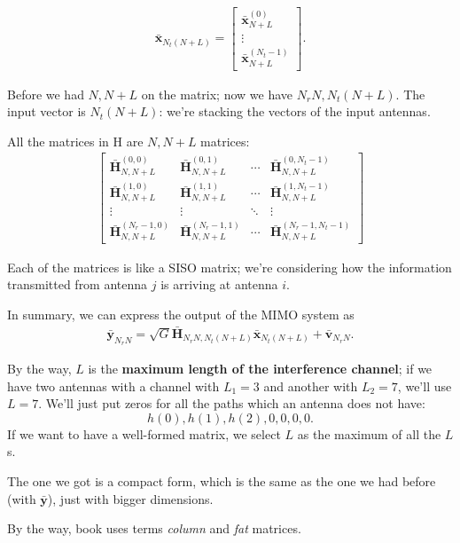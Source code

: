\documentclass[a4paper, 12pt]{book}
\begin{document}
\vspace{1em}

\begin{align*}
\bar{\boldsymbol{x}}_{N_t(N+L)} = \begin{bmatrix} \bar{\boldsymbol{x}}_{N+L}^{(0)} \\ \vdots \\ \bar{\boldsymbol{x}}_{N+L}^{(N_t-1)} \end{bmatrix}.
\end{align*}

Before we had $N, N+L$ on the matrix; now we have $N_r N, N_t(N+L)$.
The input vector is $N_t(N+L)$: we're stacking the vectors of the input antennas.

All the matrices in H are $N, N+L$ matrices:
\begin{align*}
\begin{bmatrix}
\bar{\boldsymbol{H}}_{N,N+L}^{(0,0)} & \bar{\boldsymbol{H}}_{N,N+L}^{(0,1)} & \cdots & \bar{\boldsymbol{H}}_{N,N+L}^{(0, N_t-1)} \\
\bar{\boldsymbol{H}}_{N,N+L}^{(1,0)} & \bar{\boldsymbol{H}}_{N,N+L}^{(1,1)} & \cdots & \bar{\boldsymbol{H}}_{N,N+L}^{(1, N_t-1)} \\
\vdots & \vdots & \ddots & \vdots \\
\bar{\boldsymbol{H}}_{N,N+L}^{(N_r-1,0)} & \bar{\boldsymbol{H}}_{N,N+L}^{(N_r-1,1)} & \cdots & \bar{\boldsymbol{H}}_{N,N+L}^{(N_r-1, N_t-1)}
\end{bmatrix}
\end{align*}

Each of the matrices is like a SISO matrix; we're considering how the information transmitted from antenna $j$ is arriving at antenna $i$.

In summary, we can express the output of the MIMO system as
\begin{align}
\bar{\boldsymbol{y}}_{N_r N} = \sqrt{G} \bar{\boldsymbol{H}}_{N_r N, N_t(N+L)} \bar{\boldsymbol{x}}_{N_t(N+L)} + \bar{\boldsymbol{v}}_{N_r N}. \tag{2.95}
\end{align}

By the way, $L$ is the \textbf{maximum length of the interference channel}; if we have two antennas with a channel with $L_1 = 3$ and another with $L_2 = 7$, we'll use $L=7$.
We'll just put zeros for all the paths which an antenna does not have:
\[ h(0), h(1), h(2), 0, 0, 0, 0. \]
If we want to have a well-formed matrix, we select $L$ as the maximum of all the $L$s.

The one we got is a compact form, which is the same as the one we had before (with $\bar{\boldsymbol{y}}$), just with bigger dimensions.

\noindent\colorbox{teal!10}{
    \begin{minipage}{\dimexpr\linewidth-2\fboxsep}
        By the way, book uses terms \textit{column} and \textit{fat} matrices.
    \end{minipage}
}
\end{document}
